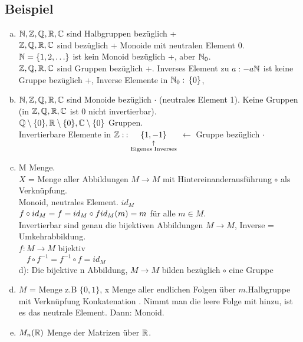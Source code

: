 \subsection{Beispiel}\label{sec:1.6}
\begin{enumerate}[a)]
\item $\mathbb{N},\mathbb{Z},\mathbb{Q},\mathbb{R},\mathbb{C}$ sind Halbgruppen bezüglich +\\
$\mathbb{Z},\mathbb{Q},\mathbb{R},\mathbb{C}$ sind bezüglich + Monoide mit neutralen Element 0.\\
$\mathbb{N} = \{ 1,2,\ldots \}$ ist kein Monoid bezüglich +, aber $\mathbb{N}_0$.\\
$\mathbb{Z},\mathbb{Q},\mathbb{R},\mathbb{C}$ sind Gruppen bezüglich +. Inverses Element zu $a : -a\\
\mathbb{N}$ ist keine Gruppe bezüglich +, Inverse Elemente in $\mathbb{N}_0:\: \{0\}$,
\item $\mathbb{N},\mathbb{Z},\mathbb{Q},\mathbb{R},\mathbb{C}$ sind Monoide bezüglich $\cdot$ (neutrales Element 1). Keine Gruppen (in $\mathbb{Z}, \mathbb{Q},\mathbb{R},\mathbb{C}$ ist 0 nicht invertierbar).\\
$\mathbb{Q}\setminus\{0\},\mathbb{R} \setminus \{0\}, \mathbb{C} \setminus \{0\}$ Gruppen.\\
Invertierbare Elemente in $\mathbb{Z}:\:: \underset{\substack{\uparrow\\\text{Eigenes Inverses}}}{\{1,-1\}}$ $\leftarrow$ Gruppe bezüglich $\cdot$
\item M Menge.\\
$X$ = Menge aller Abbildungen $M \longrightarrow M$ mit Hintereinanderausführung $\circ$ als Verknüpfung.\\
Monoid, neutrales Element. $id_M$\\
$f \circ id_M = f = id_M \circ f\\
id_M(m) = m$ für alle $m \in M$.\\
Invertierbar sind genau die bijektiven Abbildungen $M \longrightarrow M$, Inverse = Umkehrabbildung.\\
$f : M \longrightarrow M$ bijektiv\\
$\phantom{f : }f \circ f^{-1} = f^{-1} \circ f = id_M$\\
 d): Die bijektive n Abbildung, $ M \longrightarrow M$ bilden bezüglich $\circ$ eine Gruppe	
\item $M$ = Menge z.B $\{0,1\}$, x Menge aller endlichen Folgen über $m$.Halbgruppe mit Verknüpfung Konkatenation . Nimmt man die leere Folge mit hinzu, ist es das neutrale Element. Dann: Monoid.
\item $M_n(\mathbb{R})$ Menge der Matrizen über $\mathbb{R}$.\\

\end{enumerate}
